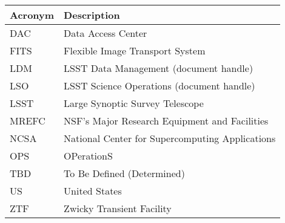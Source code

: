 \addtocounter{table}{-1}
\begin{longtable}{|l|p{}|}\hline
\textbf{Acronym} & \textbf{Description}  \\\hline

DAC & Data Access Center \\\hline
FITS & Flexible Image Transport System \\\hline
LDM & LSST Data Management (document handle) \\\hline
LSO & LSST Science Operations (document handle) \\\hline
LSST & Large Synoptic Survey Telescope \\\hline
MREFC & NSF's Major Research Equipment and Facilities \\\hline
NCSA & National Center for Supercomputing Applications \\\hline
OPS & OPerationS \\\hline
TBD & To Be Defined (Determined) \\\hline
US & United States \\\hline
ZTF & Zwicky Transient Facility \\\hline
\end{longtable}
